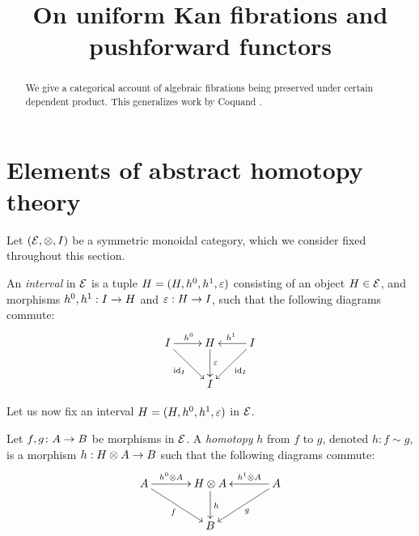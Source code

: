 \documentclass[reqno,10pt,a4paper,oneside]{amsart}
\title{On uniform Kan fibrations and pushforward functors}
\begin{document}
\begin{abstract}
We give a categorical account of algebraic fibrations being preserved under certain dependent product.
This generalizes work by Coquand \etal.
\end{abstract}

\maketitle

\tableofcontents





\section{Elements of abstract homotopy theory} 

Let $(\mathcal{E}, \otimes, I)$ be a symmetric monoidal category, which we consider fixed throughout this section. 

\begin{definition} An \emph{interval} in $\mathcal{E}$ is a tuple $H = (H, h^0, h^1, \varepsilon)$ consisting of  an object $H \in \mathcal{E}$, 
and morphisms $h^0, h^1 : I \to H$ and $\varepsilon : H \to I$,   such that the following diagrams commute:
\[
\xymatrix{
\unit \ar[r]^\intervall \ar[dr]_{\id_\unit} & \interval \ar[d]^-{\varepsilon} & \unit \ar[dl]^{\id_\unit} \ar[l]_{\intervalr}  \\
 & \unit & }
 \]
\end{definition}

Let us now fix an interval $H = (H,  h^0, h^1, \varepsilon)$ in $\mathcal{E}$. 


\begin{definition}
\label{def:homotopy}
Let $f, g \colon A \to B$ be morphisms in $\mathcal{E}$. A \emph{homotopy} $h$ from $f$ to $g$, denoted $h : f \sim g$, is a morphism $h : H \otimes A \to B$ such that the following diagrams commute:
\[
\xymatrix@C=1.2cm{
A \ar[r]^-{\intervall \otimes A} \ar[dr]_{f} & \interval \otimes A \ar[d]^{h} & A \ar[dl]^{g} \ar[l]_-{\intervalr \otimes A}  \\
 & B & }
 \]
\end{definition}
\end{document}
